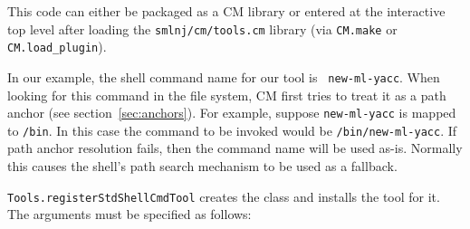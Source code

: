 \documentclass{article}
\begin{document}
This code can either be packaged as a CM library or entered at the
interactive top level after loading the {\tt smlnj/cm/tools.cm} library
(via {\tt CM.make} or {\tt CM.load\_plugin}).

In our example, the shell command name for our tool is {\tt
new-ml-yacc}.  When looking for this command in the file system, CM
first tries to treat it as a path anchor (see
section~\ref{sec:anchors}).  For example, suppose {\tt new-ml-yacc} is
mapped to {\tt /bin}.  In this case the command to be
invoked would be {\tt /bin/new-ml-yacc}.  If path anchor resolution
fails, then the command name will be used as-is.  Normally this
causes the shell's path search mechanism to be used as a fallback.

{\tt Tools.registerStdShellCmdTool} creates the class and installs the
tool for it.  The arguments must be specified as follows:
\end{document}
